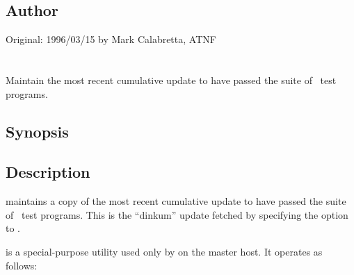 \subsection*{Author}
 
Original: 1996/03/15 by Mark Calabretta, ATNF

 
\newpage
\section{}
\label{testsuite}

Maintain the most recent cumulative update to have passed the suite of
\aipspp\ test programs.

\subsection*{Synopsis}
 
\begin{synopsis}
\end{synopsis}
 
\subsection*{Description}
 
 maintains a copy of the most recent cumulative update
to have passed the suite of \aipspp\ test programs.  This is the ``dinkum''
update fetched by specifying the  option to .

 is a special-purpose utility used only by  on
the master host.  It operates as follows:

